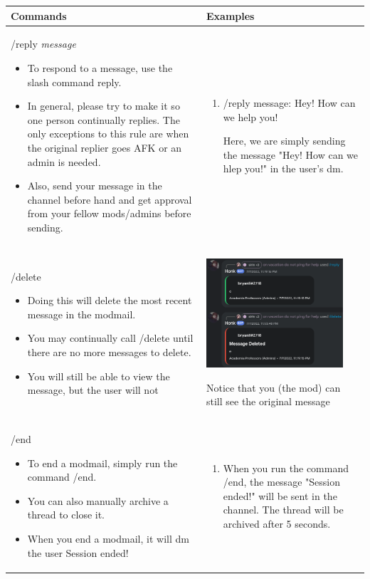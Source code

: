 \documentclass{scrartcl}
\begin{document}
\begin{tabularx}{\textwidth}{|>{\raggedright\arraybackslash}X|>{\raggedright\arraybackslash}X|}
\hline
Commands&Examples\\
\hline
/reply \textit{message}
\begin{itemize}
    \item To respond to a message, use the slash command reply.
    \item In general, please try to make it so one person continually replies. The only exceptions to this rule are when the original replier goes AFK or an admin is needed.
    \item Also, send your message in the channel before hand and get approval from your fellow mods/admins before sending.
    
\end{itemize}
& \begin{enumerate}
    \item /reply message: \color{gray} Hey! How can we help you! \color{black}
    
    Here, we are simply sending the message "Hey! How can we hlep you!" in the user's dm. 
\end{enumerate}\\
\hline
/delete
\begin{itemize}
    \item Doing this will delete the most recent message in the modmail.
    \item You may continually call /delete until there are no more messages to delete. 
    \item You will still be able to view the message, but the user will not
\end{itemize}
&
\begin{center}
    \includegraphics[width=2in]{images/modmail/delete.png}
\end{center}
Notice that you (the mod) can still see the original message\\
\hline
/end
\begin{itemize}
    \item To end a modmail, simply run the command /end. 
    \item You can also manually archive a thread to close it.
    \item When you end a modmail, it will dm the user Session ended!
\end{itemize}
&
\begin{enumerate}
    \item When you run the command /end, the message "Session ended!" will be sent in the channel. The thread will be archived after 5 seconds.
\end{enumerate}\\
\hline
\end{tabularx}
\newpage
\end{document}
